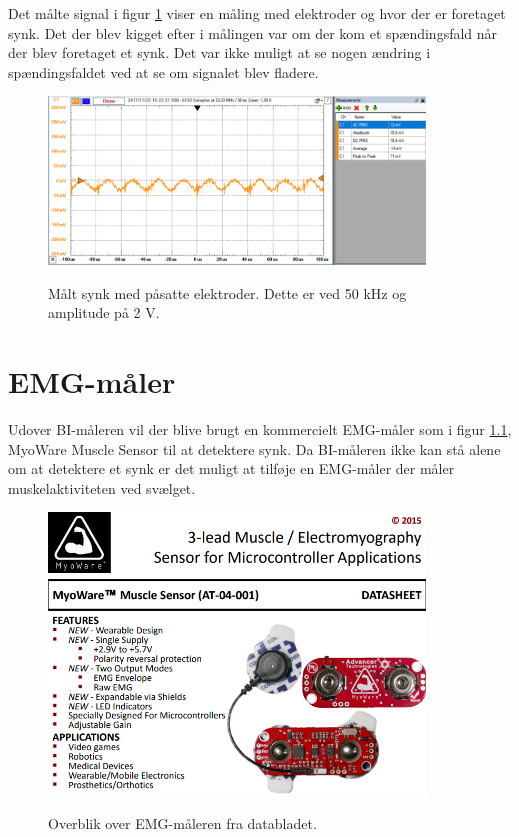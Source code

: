 Det målte signal i figur \ref{fig:synk1} viser en måling med elektroder og hvor der er foretaget synk. Det der blev kigget efter i målingen var om der kom et spændingsfald når der blev foretaget et synk. Det var ikke muligt at se nogen ændring i spændingsfaldet ved at se om signalet blev fladere. 

\begin{figure}[H]
\centering
{\includegraphics[width=10cm]
{Figure/synk1}}
\caption{Målt synk med påsatte elektroder. Dette er ved 50 kHz og amplitude på 2 V.}
\label{fig:synk1}
\end{figure}








\chapter{EMG-måler}

Udover BI-måleren vil der blive brugt en kommercielt EMG-måler som i figur \ref{fig:emgdata}, MyoWare Muscle Sensor til at detektere synk. Da BI-måleren ikke kan stå alene om at detektere et synk er det muligt at tilføje en EMG-måler der måler muskelaktiviteten ved svælget. 

\begin{figure}[H]
\centering
{\includegraphics[width=10cm]
{Figure/emgdata}}
\caption{Overblik over EMG-måleren fra databladet.}
\label{fig:emgdata}
\end{figure}

